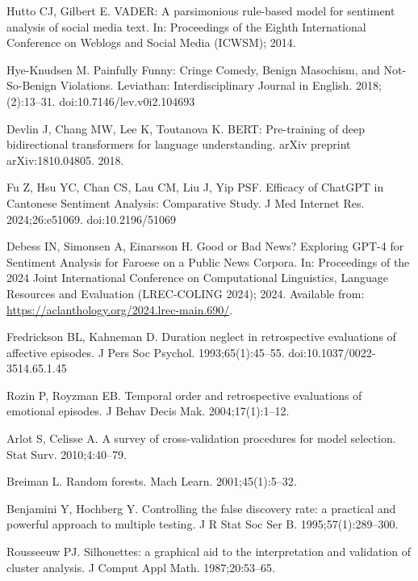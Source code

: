 \documentclass[10pt,letterpaper]{article}
\begin{document}
\begin{thebibliography}{22}
Hutto CJ, Gilbert E.
\newblock VADER: A parsimonious rule-based model for sentiment analysis of social media text.
\newblock In: Proceedings of the Eighth International Conference on Weblogs and Social Media (ICWSM); 2014.

Hye-Knudsen M.
\newblock Painfully Funny: Cringe Comedy, Benign Masochism, and Not-So-Benign Violations.
\newblock Leviathan: Interdisciplinary Journal in English. 2018;(2):13--31.
\newblock doi:10.7146/lev.v0i2.104693

Devlin J, Chang MW, Lee K, Toutanova K.
\newblock BERT: Pre-training of deep bidirectional transformers for language understanding.
\newblock arXiv preprint arXiv:1810.04805. 2018.

Fu Z, Hsu YC, Chan CS, Lau CM, Liu J, Yip PSF.
\newblock Efficacy of ChatGPT in Cantonese Sentiment Analysis: Comparative Study.
\newblock J Med Internet Res. 2024;26:e51069.
\newblock doi:10.2196/51069

Debess IN, Simonsen A, Einarsson H.
\newblock Good or Bad News? Exploring GPT-4 for Sentiment Analysis for Faroese on a Public News Corpora.
\newblock In: Proceedings of the 2024 Joint International Conference on Computational Linguistics, Language Resources and Evaluation (LREC-COLING 2024); 2024.
\newblock Available from: \url{https://aclanthology.org/2024.lrec-main.690/}.

Fredrickson BL, Kahneman D.
\newblock Duration neglect in retrospective evaluations of affective episodes.
\newblock J Pers Soc Psychol. 1993;65(1):45--55.
\newblock doi:10.1037/0022-3514.65.1.45


Rozin P, Royzman EB.
\newblock Temporal order and retrospective evaluations of emotional episodes.
\newblock J Behav Decis Mak. 2004;17(1):1--12.

Arlot S, Celisse A.
\newblock A survey of cross-validation procedures for model selection.
\newblock Stat Surv. 2010;4:40--79.

Breiman L.
\newblock Random forests.
\newblock Mach Learn. 2001;45(1):5--32.

Benjamini Y, Hochberg Y.
\newblock Controlling the false discovery rate: a practical and powerful approach to multiple testing.
\newblock J R Stat Soc Ser B. 1995;57(1):289--300.

Rousseeuw PJ.
\newblock Silhouettes: a graphical aid to the interpretation and validation of cluster analysis.
\newblock J Comput Appl Math. 1987;20:53--65.


\end{thebibliography}
\end{document}
